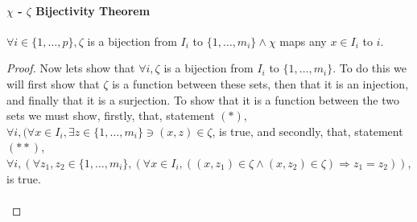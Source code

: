 \documentclass{article}
\begin{document}
\paragraph{$\chi$ - $\zeta$ Bijectivity Theorem}
$\forall i \in \{1, \ldots, p\}, \zeta$ is a bijection from $I_i$ to $\{1, \ldots, m_i\} \wedge \chi$ maps any $x \in I_i$ to $i$.
\begin{proof}
Now lets show that $\forall i, \zeta$ is a bijection from $I_i$ to $\{1, \ldots, m_i\}$. To do this we will first show that $\zeta$ is a function between these sets, then that it is an injection, and finally that it is a surjection. To show that it is a function between the two sets we must show, firstly, that, statement $(*)$, $\forall i, (\forall x \in I_i, \exists z \in \{1, \ldots, m_i\} \ni (x, z) \in \zeta$, is true, and secondly, that, statement $(**)$, $\forall i, (\forall z_1,  z_2 \in \{1, \ldots, m_i\}, (\forall x \in I_i, ((x, z_1) \in \zeta \wedge (x, z_2) \in \zeta) \Rightarrow z_1 = z_2))$, is true.\\\\
\end{proof}
\end{document}

